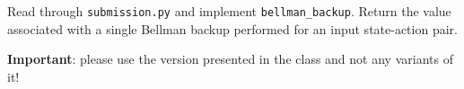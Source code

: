 \item {}

Read through \texttt{submission.py} and implement \texttt{bellman\_backup}. Return the value associated with a single Bellman backup performed for an input state-action pair.

\textbf{Important}: please use the version presented in the class and not any variants of it!